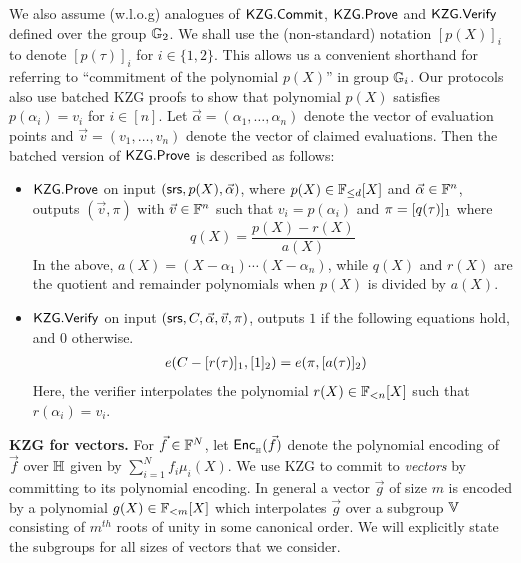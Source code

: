 We also assume (w.l.o.g) analogues of $\mathsf{KZG.Commit}$, $\mathsf{KZG.Prove}$ and $\mathsf{KZG.Verify}$ defined over the group $\mathbb{G}_2$.
We shall use the (non-standard) notation $[p(X)]_i$ to denote $[p(\tau)]_i$ for $i\in \{1,2\}$.
This allows us a convenient shorthand for referring to ``commitment of the polynomial $p(X)$'' in group $\mathbb{G}_i$.
Our protocols also use batched KZG proofs to show that polynomial $p(X)$ satisfies $p(\alpha_i)=v_i$ for $i\in [n]$. Let
$\vec{\alpha}=(\alpha_1,\ldots,\alpha_n)$
denote the vector of evaluation points and $\vec{v}=(v_1,\ldots,v_n)$ denote the vector of claimed evaluations. Then the batched
version of $\mathsf{KZG.Prove}$ is described as follows:
\begin{itemize}[leftmargin=1em]
	\item $\mathsf{KZG.Prove}$ on input $(\mathsf{srs},p(X),\vec{\alpha})$, where $p(X) \in \mathbb{F}_{\leq d}[X]$ and $\vec{\alpha}\in\mathbb{F}^n$,
	outputs $(\vec{v}, \pi)$ with $\vec{v}\in \mathbb{F}^n$ such that $v_i=p(\alpha_i)$ and $\pi=[q(\tau)]_1$ where
	\[ q(X)=\frac{p(X)-r(X)}{a(X)} \]
	In the above, $a(X)=(X-\alpha_1)\cdots(X-\alpha_n)$, while $q(X)$ and $r(X)$ are the quotient and remainder polynomials when
	 $p(X)$ is divided by $a(X)$.
	\item $\mathsf{KZG.Verify}$ on input $(\mathsf{srs},C,\vec{\alpha},\vec{v},\pi)$, outputs $1$ if the following equations hold, and $0$ otherwise.
	\begin{align*}
		e(C-[r(\tau)]_1, [1]_2) &= e(\pi, [a(\tau)]_2)
	\end{align*}
	Here, the verifier interpolates the polynomial $r(X)\in \mathbb{F}_{<n}[X]$ such that $r(\alpha_i)=v_i$.
\end{itemize}

\noindent\textbf{KZG for vectors.} For $\vec{f}\in \mathbb{F}^N$, let $\mathsf{Enc}_{{}_{\mathbb{H}}}(\vec{f})$ denote the polynomial encoding of $\vec{f}$ over $\mathbb{H}$ given by $\sum_{i=1}^N f_i\mu_i(X)$.
We use KZG to commit to \emph{vectors} by committing to its polynomial encoding. In general a vector $\vec{g}$ of size $m$ is encoded by a polynomial $g(X)\in \mathbb{F}_{<m}[X]$
which interpolates $\vec{g}$ over a subgroup $\mathbb{V}$ consisting of $m^{th}$ roots of unity in some canonical order. We will explicitly state the subgroups for all sizes
of vectors that we consider.

